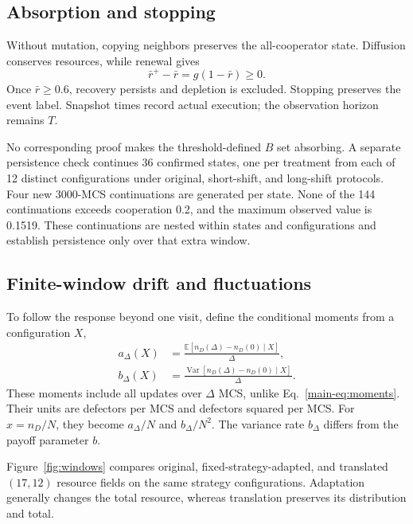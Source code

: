 \subsection{Absorption and stopping}

Without mutation, copying neighbors preserves the all-cooperator state. Diffusion conserves resources, while renewal gives
\begin{equation}
\label{eq:absorbing}
\bar r^+-\bar r=g(1-\bar r)\ge0.
\end{equation}
Once $\bar r\ge0.6$, recovery persists and depletion is excluded. Stopping preserves the event label. Snapshot times record actual execution; the observation horizon remains $T$.

No corresponding proof makes the threshold-defined $B$ set absorbing. A separate persistence check continues 36 confirmed states, one per treatment from each of 12 distinct configurations under original, short-shift, and long-shift protocols. Four new 3000-MCS continuations are generated per state. None of the 144 continuations exceeds cooperation 0.2, and the maximum observed value is 0.1519. These continuations are nested within states and configurations and establish persistence only over that extra window.

\subsection{Finite-window drift and fluctuations}

To follow the response beyond one visit, define the conditional moments from a configuration $X$,
\begin{equation}
\label{eq:finite_moments}
\begin{aligned}
a_\Delta(X)&=\frac{\mathbb E[n_D(\Delta)-n_D(0)\mid X]}{\Delta},\\
b_\Delta(X)&=\frac{\operatorname{Var}[n_D(\Delta)-n_D(0)\mid X]}{\Delta}.
\end{aligned}
\end{equation}
These moments include all updates over $\Delta$ MCS, unlike Eq.~\eqref{main-eq:moments}. Their units are defectors per MCS and defectors squared per MCS. For $x=n_D/N$, they become $a_\Delta/N$ and $b_\Delta/N^2$. The variance rate $b_\Delta$ differs from the payoff parameter $b$.

Figure~\ref{fig:windows} compares original, fixed-strategy-adapted, and translated $(17,12)$ resource fields on the same strategy configurations. Adaptation generally changes the total resource, whereas translation preserves its distribution and total.

